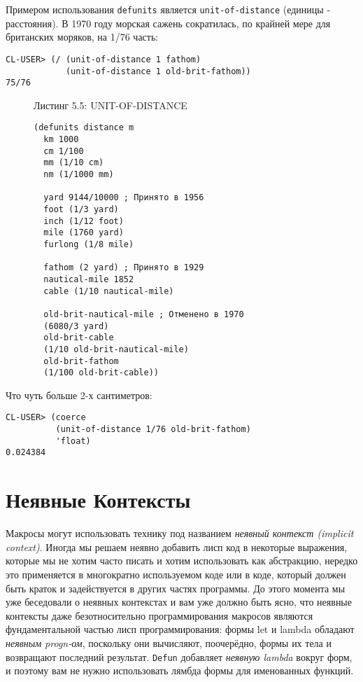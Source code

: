 Примером использования \verb"defunits" является \verb"unit-of-distance" (единицы - расстояния). В 1970 году морская сажень сократилась, по крайней мере для британских моряков, на 1/76 часть:

\begin{verbatim}
CL-USER> (/ (unit-of-distance 1 fathom)
            (unit-of-distance 1 old-brit-fathom))
75/76
\end{verbatim}

\begin{figure}Листинг 5.5: UNIT-OF-DISTANCE\label{listing_5.5}
\listbegin
\begin{verbatim}
(defunits distance m
  km 1000
  cm 1/100
  mm (1/10 cm)
  nm (1/1000 mm)

  yard 9144/10000 ; Принято в 1956
  foot (1/3 yard)
  inch (1/12 foot)
  mile (1760 yard)
  furlong (1/8 mile)

  fathom (2 yard) ; Принято в 1929
  nautical-mile 1852
  cable (1/10 nautical-mile)
  
  old-brit-nautical-mile ; Отменено в 1970
  (6080/3 yard)
  old-brit-cable
  (1/10 old-brit-nautical-mile)
  old-brit-fathom
  (1/100 old-brit-cable))
\end{verbatim}
\listend
\end{figure}

Что чуть больше 2-х сантиметров:

\begin{verbatim}
CL-USER> (coerce
          (unit-of-distance 1/76 old-brit-fathom)
          'float)
0.024384
\end{verbatim}

\section{Неявные Контексты}\label{section_implicit_contexts}

Макросы могут использовать технику под названием \emph{неявный контекст (implicit context)}. Иногда мы решаем неявно добавить лисп код в некоторые выражения, которые мы не хотим часто писать и хотим использовать как абстракцию, нередко это применяется в многократно используемом коде или в коде, который должен быть краток и задействуется в других частях программы. До этого момента мы уже беседовали о неявных контекстах и вам уже должно быть ясно, что неявные контексты даже безотносительно программирования макросов являются фундаментальной частью лисп программирования: формы let и lambda обладают \emph{неявным progn-ом}, поскольку они вычисляют, поочерёдно, формы их тела и возвращают последний результат. \verb"Defun" добавляет \emph{неявную lambda} вокруг форм, и поэтому вам не нужно использовать лямбда формы для именованных функций.

